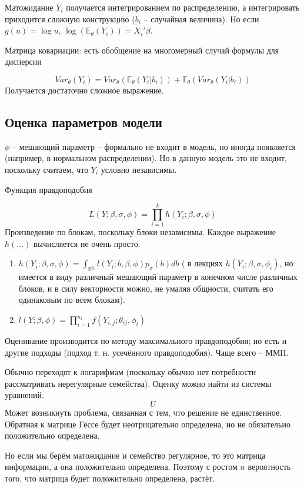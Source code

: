 \documentclass[main.tex]{subfiles}
\begin{document}
Матожидание $ Y_i $ получается интегрированием по распределению, а интегрировать приходится сложную конструкцию ($b_i$ -- случайная величина).
Но если $ g(u)=\log u $, $ \log (\mathds E_\theta(Y_i)) = X_i' \beta $.

Матрица ковариации: есть обобщение на многомерный случай формулы для дисперсии

\[ Var_\theta(Y_i) = Var_\theta(\mathds E_\theta(Y_i|b_i)) + \mathds E_\theta(Var_\theta (Y_i|b_i)) \]
Получается достаточно сложное выражение. \\

\subsection{Оценка параметров модели}

$ \phi $ -- мешающий параметр -- формально не входит в модель, но иногда появляется (например, в нормальном распределении).
Но в данную модель это не входит, поскольку считаем, что $ Y_i $ условно независимы.

Функция правдоподобия

\[ L(Y; \beta, \sigma, \phi) = \prod_{i=1}^{k} h(Y_i; \beta, \sigma, \phi) \]
Произведение по блокам, поскольку блоки независимы.
Каждое выражение $ h(...) $ вычисляется не очень просто.
\begin{enumerate}[noitemsep]
	\item $ h(Y_i; \beta, \sigma, \phi) = \int_{\mathds R^{q_i}} l(Y_i; b, \beta, \phi) p_\sigma (b) db $ ( в лекциях $ h(Y_i; \beta, \sigma, \phi_i) $, но имеется в виду различный мешающий параметр в конечном числе различных блоков, и в силу векторности можно, не умаляя общности, считать его одинаковым по всем блокам).
	\item $ l(Y; \beta, \phi) = \prod_{i=1}^{n_i} f(Y_{i,j}; \theta_{ij}, \phi_i) $
\end{enumerate}

Оценивание производится по методу максимального правдоподобия; но есть и другие подходы (подход т. н. усечённого правдоподобия).
Чаще всего -- ММП.

Обычно переходят к логарифмам (поскольку обычно нет потребности рассматривать нерегулярные семейства).
Оценку можно найти из системы уравнений.
\[ U \] %
Может возникнуть проблема, связанная с тем, что решение не единственное.
Обратная к матрице Гёссе будет неотрицательно определена, но не обязательно положительно определена.

Но если мы берём матожидание и семейство регулярное, то это матрица информации, а она положительно определена.
Поэтому с ростом $ n $ вероятность того, что матрица будет положительно определена, растёт.
\end{document}
